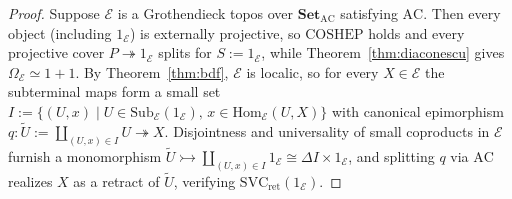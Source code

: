 \begin{proof}
Suppose $\mathcal{E}$ is a Grothendieck topos over $\mathbf{Set}_{\mathrm{AC}}$ satisfying $\mathrm{AC}$. Then every object (including $1_{\mathcal{E}}$) is externally projective, so $\mathrm{COSHEP}$ holds and every projective cover $P \twoheadrightarrow 1_{\mathcal{E}}$ splits for $S := 1_{\mathcal{E}}$, while Theorem~\ref{thm:diaconescu} gives $\Omega_{\mathcal{E}} \simeq 1+1$. By Theorem~\ref{thm:bdf}, $\mathcal{E}$ is localic, so for every $X \in \mathcal{E}$ the subterminal maps form a small set $I := \{(U, x) \mid U \in \mathrm{Sub}_{\mathcal{E}}(1_{\mathcal{E}}),\, x \in \mathrm{Hom}_{\mathcal{E}}(U, X)\}$ with canonical epimorphism $q : \widetilde{U} := \coprod_{(U, x) \in I} U \twoheadrightarrow X$. Disjointness and universality of small coproducts in $\mathcal{E}$ furnish a monomorphism $\widetilde{U} \rightarrowtail \coprod_{(U, x) \in I} 1_{\mathcal{E}} \cong \Delta I \times 1_{\mathcal{E}}$, and splitting $q$ via $\mathrm{AC}$ realizes $X$ as a retract of $\widetilde{U}$, verifying $\mathrm{SVC}_{\mathrm{ret}}(1_{\mathcal{E}})$.


\end{proof}
